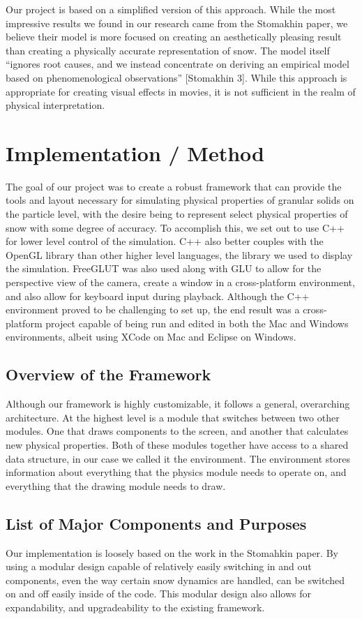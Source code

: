 \documentclass{acm_proc_article-sp}
\begin{document}
Our project is based on a simplified version of this approach. While the most impressive results we found in our research came from the Stomakhin paper, we believe their model is more focused on creating an aesthetically pleasing result than creating a physically accurate representation of snow. The model itself “ignores root causes, and we instead concentrate on deriving an empirical model based on phenomenological observations” [Stomakhin 3]. While this approach is appropriate for creating visual effects in movies, it is not sufficient in the realm of physical interpretation.

\section{Implementation /  Method}
The goal of our project was to create a robust framework that can provide the tools and layout necessary for simulating physical properties of granular solids on the particle level, with the desire being to represent select physical properties of snow with some degree of accuracy. To accomplish this, we set out to use C++ for lower level control of the simulation. C++ also better couples with the OpenGL library than other higher level languages, the library we used to display the simulation. FreeGLUT was also used along with GLU to allow for the perspective view of the camera, create a window in a cross-platform environment, and also allow for keyboard input during playback. Although the C++ environment proved to be challenging to set up, the end result was a cross-platform project capable of being run and edited in both the Mac and Windows environments, albeit using XCode on Mac and Eclipse on Windows.

\subsection{Overview of the Framework}
Although our framework is highly customizable, it follows a general, overarching architecture. At the highest level is a module that switches between two other modules. One that draws components to the screen, and another that calculates new physical properties. Both of these modules together have access to a shared data structure, in our case we called it the environment. The environment stores information about everything that the physics module needs to operate on, and everything that the drawing module needs to draw.

\subsection{List of Major Components and Purposes}
Our implementation is loosely based on the work in the Stomahkin paper. By using a modular design capable of relatively easily switching in and out components, even the way certain snow dynamics are handled, can be switched on and off easily inside of the code. This modular design also allows for expandability, and upgradeability to the existing framework.
\end{document}

